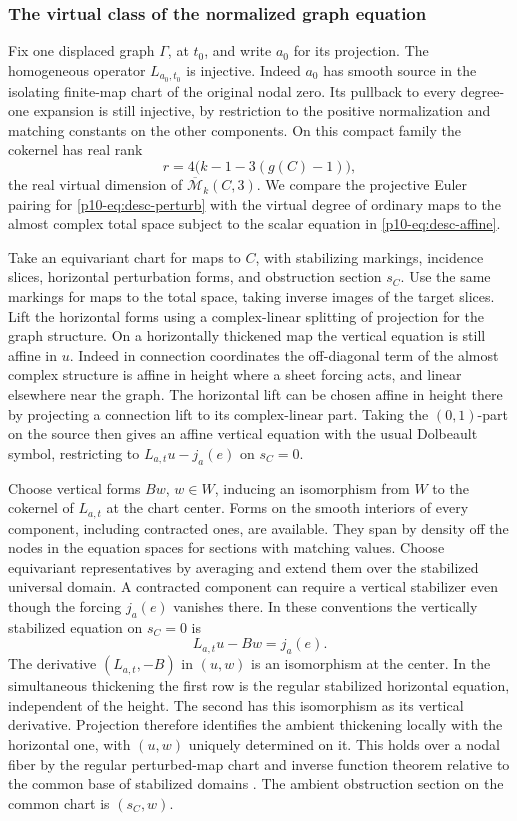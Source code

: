 \subsubsection{The virtual class of the normalized graph equation}
Fix one displaced graph $\Gamma$, at $t_0$, and write $a_0$ for its
projection. The homogeneous operator $L_{a_0,t_0}$ is injective.
Indeed $a_0$ has smooth source in the isolating finite-map chart of
the original nodal zero. Its pullback to every degree-one expansion
is still injective, by restriction to the positive normalization
and matching constants on the other components. On this compact
family the cokernel has real rank
\[
                   r=4\bigl(k-1-3(g(C)-1)\bigr),
\]
the real virtual dimension of $\overline{\mathcal M}_k(C,3)$.
We compare the projective Euler pairing for \eqref{p10-eq:desc-perturb}
with the virtual degree of ordinary maps to the almost complex
total space subject to the scalar equation in \eqref{p10-eq:desc-affine}.

Take an equivariant chart for maps to $C$, with stabilizing markings,
incidence slices, horizontal perturbation forms, and obstruction
section $s_C$. Use the same markings for maps to the total space,
taking inverse images of the target slices. Lift the horizontal forms
using a complex-linear splitting of projection for the graph
structure. On a horizontally thickened map the vertical equation
is still affine in $u$. Indeed in connection coordinates the
off-diagonal term of the almost complex structure is affine in height
where a sheet forcing acts, and linear elsewhere near the graph.
The horizontal lift can be chosen affine in height there by projecting
a connection lift to its complex-linear part. Taking the
$(0,1)$-part on the source then gives an affine vertical equation
with the usual Dolbeault symbol, restricting to $L_{a,t}u-j_a(e)$ on
$s_C=0$.

Choose vertical forms $B w$, $w\in W$, inducing an isomorphism from
$W$ to the cokernel of $L_{a,t}$ at the chart center. Forms on the
smooth interiors of every component, including contracted ones, are
available. They span by density off the nodes in the equation spaces
for sections with matching values. Choose equivariant representatives
by averaging and extend them over the stabilized universal domain.
A contracted component can require a vertical stabilizer even though
the forcing $j_a(e)$ vanishes there. In these conventions the
vertically stabilized equation on $s_C=0$ is
\begin{equation}\label{p10-eq:desc-stabilized}
                      L_{a,t}u-Bw=j_a(e).
\end{equation}
The derivative $(L_{a,t},-B)$ in $(u,w)$ is an isomorphism at the
center. In the simultaneous thickening the first row is the regular
stabilized horizontal equation, independent of the height. The
second has this isomorphism as its vertical derivative. Projection
therefore identifies the ambient thickening locally with the
horizontal one, with $(u,w)$ uniquely determined on it. This holds
over a nodal fiber by the regular perturbed-map chart and inverse
function theorem relative to the common base of stabilized domains
\cite[Theorem~3.5 and Lemma~5.10]{swam}. The ambient obstruction
section on the common chart is $(s_C,w)$.

